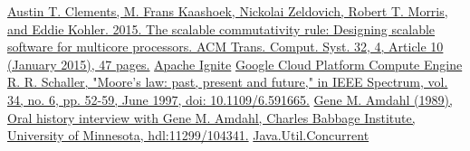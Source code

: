 \documentclass[conference]{IEEEtran}
\begin{document}
\begin{thebibliography}{00}
 \href{https://dl.acm.org/doi/10.1145/2699681}{Austin T. Clements, M. Frans Kaashoek, Nickolai Zeldovich, Robert T. Morris, and Eddie Kohler. 2015. The scalable commutativity rule: Designing scalable software for multicore processors. ACM Trans. Comput. Syst. 32, 4, Article 10 (January 2015), 47 pages.}
 \href{https://ignite.apache.org/docs/latest/}{Apache Ignite}
 \href{https://cloud.google.com/compute/docs}{Google Cloud Platform Compute Engine}
 \href{https://ieeexplore.ieee.org/document/591665}{R. R. Schaller, "Moore's law: past, present and future," in IEEE Spectrum, vol. 34, no. 6, pp. 52-59, June 1997, doi: 10.1109/6.591665.}
 \href{https://conservancy.umn.edu/handle/11299/104341}{Gene M. Amdahl (1989), Oral history interview with Gene M. Amdahl, Charles Babbage Institute, University of Minnesota, hdl:11299/104341.}
 \href{https://docs.oracle.com/javase/8/docs/api/index.html?java/util/concurrent/package-summary.html}{Java.Util.Concurrent}

\end{thebibliography}

\vspace{12pt}
\end{document}
